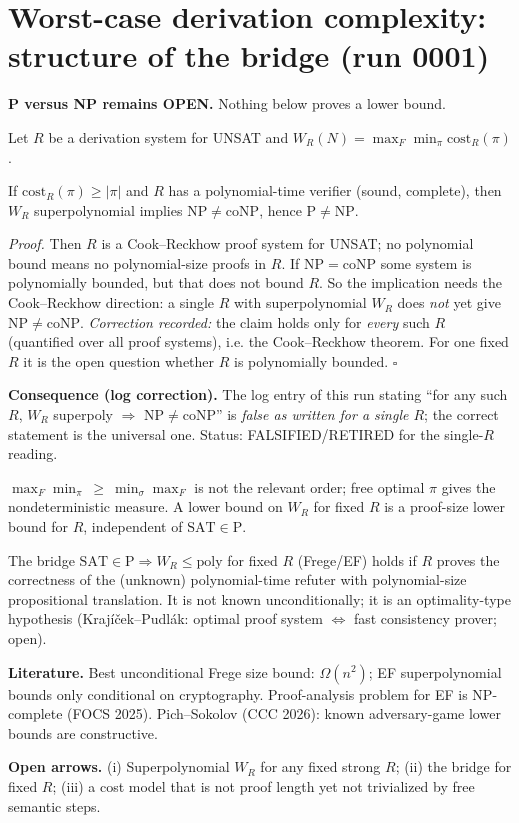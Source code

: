\documentclass{article}\usepackage{amsmath,amssymb,amsthm}
\begin{document}
\section*{Worst-case derivation complexity: structure of the bridge (run 0001)}
\textbf{P versus NP remains OPEN.} Nothing below proves a lower bound.

Let $R$ be a derivation system for UNSAT and $W_R(N)=\max_{F}\min_{\pi}\mathrm{cost}_R(\pi)$.

\begin{prop} If $\mathrm{cost}_R(\pi)\ge|\pi|$ and $R$ has a polynomial-time verifier (sound, complete), then $W_R$ superpolynomial implies $\mathrm{NP}\ne\mathrm{coNP}$, hence $\mathrm{P}\ne\mathrm{NP}$.
\end{prop}
\emph{Proof.} Then $R$ is a Cook--Reckhow proof system for UNSAT; no polynomial bound means no polynomial-size proofs in $R$. If $\mathrm{NP}=\mathrm{coNP}$ some system is polynomially bounded, but that does not bound $R$. So the implication needs the Cook--Reckhow direction: a single $R$ with superpolynomial $W_R$ does \emph{not} yet give $\mathrm{NP}\ne\mathrm{coNP}$. \emph{Correction recorded:} the claim holds only for \emph{every} such $R$ (quantified over all proof systems), i.e. the Cook--Reckhow theorem. For one fixed $R$ it is the open question whether $R$ is polynomially bounded. $\square$

\textbf{Consequence (log correction).} The log entry of this run stating ``for any such $R$, $W_R$ superpoly $\Rightarrow$ NP$\ne$coNP'' is \emph{false as written for a single $R$}; the correct statement is the universal one. Status: FALSIFIED/RETIRED for the single-$R$ reading.

\begin{prop} $\max_F\min_\pi\ \ge\ \min_\sigma\max_F$ is not the relevant order; free optimal $\pi$ gives the nondeterministic measure. A lower bound on $W_R$ for fixed $R$ is a proof-size lower bound for $R$, independent of $\mathrm{SAT}\in\mathrm P$.
\end{prop}

\begin{prop}[CONDITIONAL] The bridge $\mathrm{SAT}\in\mathrm P\Rightarrow W_R\le\mathrm{poly}$ for fixed $R$ (Frege/EF) holds if $R$ proves the correctness of the (unknown) polynomial-time refuter with polynomial-size propositional translation. It is not known unconditionally; it is an optimality-type hypothesis (Krajíček--Pudlák: optimal proof system $\iff$ fast consistency prover; open).
\end{prop}

\textbf{Literature.} Best unconditional Frege size bound: $\Omega(n^2)$; EF superpolynomial bounds only conditional on cryptography. Proof-analysis problem for EF is NP-complete (FOCS 2025). Pich--Sokolov (CCC 2026): known adversary-game lower bounds are constructive.

\textbf{Open arrows.} (i) Superpolynomial $W_R$ for any fixed strong $R$; (ii) the bridge for fixed $R$; (iii) a cost model that is not proof length yet not trivialized by free semantic steps.

\end{document}
